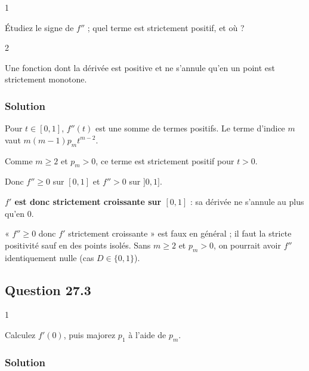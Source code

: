\documentclass[11pt,a4paper]{article}
\begin{document}
\begin{indication}{1}

Étudiez le signe de \(f''\) ; quel terme est strictement positif, et où ?

\end{indication}

\begin{indication}{2}

Une fonction dont la dérivée est positive et ne s'annule qu'en un point est strictement monotone.

\end{indication}

\hypertarget{solution-63}{%
\subsubsection{Solution}\label{solution-63}}

Pour \(t\in[0,1]\), \(f''(t)\) est une somme de termes positifs. Le terme d'indice \(m\) vaut \(m(m-1)p_mt^{m-2}\).

Comme \(m\ge2\) et \(p_m>0\), ce terme est strictement positif pour \(t>0\).

Donc \(f''\ge0\) sur \([0,1]\) et \(f''>0\) sur \(]0,1]\).

\textbf{\(f'\) est donc strictement croissante sur \([0,1]\)} : sa dérivée ne s'annule au plus qu'en \(0\).

\begin{piege}

« \(f''\ge0\) donc \(f'\) strictement croissante » est faux en général ; il faut la stricte positivité sauf en des points isolés. Sans \(m\ge2\) et \(p_m>0\), on pourrait avoir \(f''\) identiquement nulle (cas \(D\in\{0,1\}\)).

\end{piege}

\hypertarget{question-27.3}{%
\subsection{Question 27.3}\label{question-27.3}}

\begin{indication}{1}

Calculez \(f'(0)\), puis majorez \(p_1\) à l'aide de \(p_m\).

\end{indication}

\hypertarget{solution-64}{%
\subsubsection{Solution}\label{solution-64}}
\end{document}
